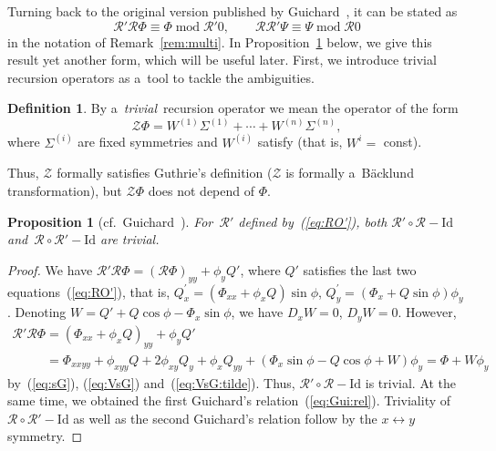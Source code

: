 \documentclass[pdftex]{sigma}
\def\eqref#1{{\rm(\ref{#1})}}
\def\RO{{\mathcal R}}
\def\Z{{\mathcal Z}}
\numberwithin{equation}{section}
\newtheorem{Proposition}[Theorem]{Proposition}
\theoremstyle{definition}
\newtheorem{Definition}[Theorem]{Definition}
\begin{document}
Turning back to the original version published by
Guichard~\cite{CG-1890b,CG-1890a},
it can be stated as
\begin{equation} \label{eq:Gui:rel}
\RO' \RO \Phi \equiv \Phi \operatorname{mod} \RO'0, \qquad
\RO \RO' \Psi \equiv \Psi \operatorname{mod} \RO0
\end{equation}
in the notation of Remark~\ref{rem:multi}.
In Proposition~\ref{prop:sG:RO:Guthrie:inv} below,
we give this result yet another form,
which will be useful later.
First, we introduce trivial recursion operators as a~tool to tackle the
ambiguities.

\begin{Definition}\label{def:RO:triv}
By a~{\it trivial}~recursion operator we mean the operator
of the form
\[
\Z\Phi = W^{(1)} \Sigma^{(1)} + \cdots + W^{(n)} \Sigma^{(n)},
\]
where $\Sigma^{(i)}$ are fixed symmetries and $W^{(i)}$ satisfy
(that is, $W^i = $ const).
\end{Definition}

Thus, $\Z$ formally satisfies Guthrie's definition
($\Z$ is formally a~B\"acklund transformation),
but $\Z\Phi$ does not depend of $\Phi$.



\begin{Proposition}[cf.\ {Guichard~\cite{CG-1890b,CG-1890a}}]
\label{prop:sG:RO:Guthrie:inv}
For~$\RO'$ defined by~\eqref{eq:RO'},
both $\RO' \circ \RO - \mathrm{Id}$ and~$\RO \circ \RO' - \mathrm{Id}$ are trivial.
\end{Proposition}




\begin{proof}
We have
$
\RO' \RO \Phi = (\RO \Phi)_{yy} + \phi_y Q'$,
where $Q'$ satisfies the last two equations~\eqref{eq:RO'},
that is,
$
Q^{\prime}_x = (\Phi_{xx} + \phi_x Q) \sin \phi$,
$
Q^{\prime}_y
 = (\Phi_x + Q \sin\phi) \phi_y$.
Denoting $W = Q' + Q \cos \phi - \Phi_x \sin \phi$, we have
$
D_x W = 0$, $D_y W = 0$.
However,
\begin{gather*}
\RO' \RO \Phi = (\Phi_{xx} + \phi_x Q)_{yy} + \phi_y Q'
\\
\phantom{\RO' \RO \Phi}{}
 = \Phi_{xxyy} + \phi_{xyy} Q + 2 \phi_{xy} Q_y + \phi_x Q_{yy}
 + (\Phi_x \sin \phi - Q \cos \phi + W) \phi_y
 = \Phi + W\phi_y
\end{gather*}
by~\eqref{eq:sG}, \eqref{eq:VsG} and~\eqref{eq:VsG:tilde}.
Thus, $\RO' \circ \RO - \mathrm{Id}$ is trivial.
At the same time, we obtained the first Guichard's relation~\eqref{eq:Gui:rel}.
Triviality of
$\RO \circ \RO' - \mathrm{Id}$ as well as the second Guichard's relation
follow by the $x \leftrightarrow y$ symmetry.
\end{proof}
\end{document}
